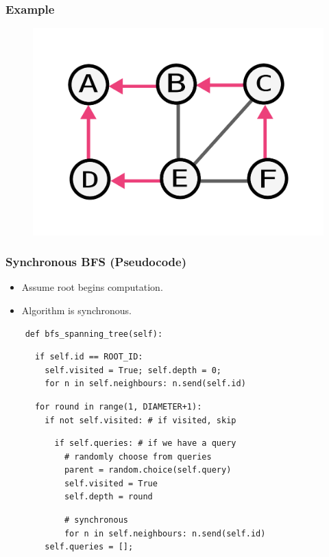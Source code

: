 \documentclass{beamer}
\begin{document}
\begin{frame}
    \frametitle{Example}
    \begin{figure}
    \includegraphics[width=0.5\paperwidth]{round3-end.pdf}
    \end{figure}
\end{frame}

\begin{frame}[fragile]
    \frametitle{Synchronous BFS (Pseudocode)}
    \begin{itemize}
        \item Assume root begins computation.
        \item Algorithm is synchronous.
    \end{itemize}
    \pause

    \begin{verbatim}
    def bfs_spanning_tree(self):
    \end{verbatim}
    \pause
    \begin{verbatim}
      if self.id == ROOT_ID:
        self.visited = True; self.depth = 0;
        for n in self.neighbours: n.send(self.id)
    \end{verbatim}
    \pause
    \begin{verbatim}
      for round in range(1, DIAMETER+1):
        if not self.visited: # if visited, skip
    \end{verbatim}
    \pause
    \begin{verbatim}
          if self.queries: # if we have a query
            # randomly choose from queries
            parent = random.choice(self.query)
            self.visited = True
            self.depth = round
    \end{verbatim}
    \pause
    \begin{verbatim}
            # synchronous
            for n in self.neighbours: n.send(self.id)
        self.queries = [];
    \end{verbatim}
\end{frame}
\end{document}
